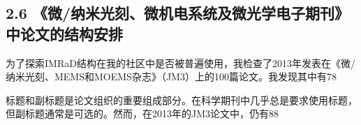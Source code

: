 \subsection*{2.6 《微/纳米光刻、微机电系统及微光学电子期刊》中论文的结构安排}
为了探索IMRaD结构在我的社区中是否被普遍使用，我检查了2013年发表在《微/纳米光刻、MEMS和MOEMS杂志》（JM3）上的100篇论文。我发现其中有78%

标题和副标题是论文组织的重要组成部分。在科学期刊中几乎总是要求使用标题，但副标题通常是可选的。然而，在2013年的JM3论文中，仍有88%

